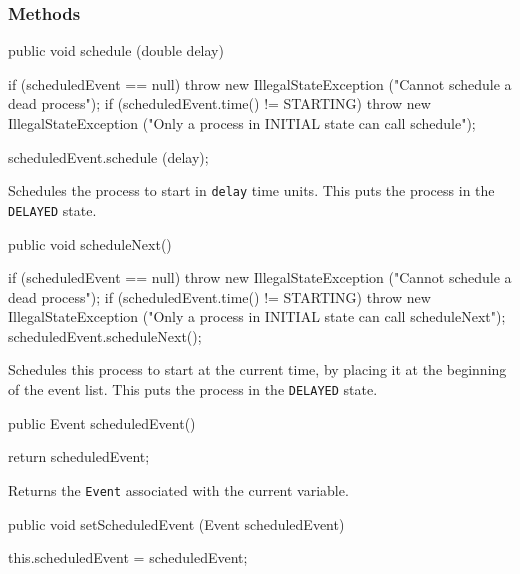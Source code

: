 \subsubsection* {Methods}
\begin{code}

   public void schedule (double delay) \begin{hide} {
      if (scheduledEvent == null)
         throw new IllegalStateException ("Cannot schedule a dead process");
      if (scheduledEvent.time() != STARTING)
         throw new IllegalStateException ("Only a process in INITIAL state can call schedule");

      scheduledEvent.schedule (delay);
   } \end{hide}
\end{code}
\begin{tabb}
   Schedules the process to start in \texttt{delay} time units.
   This puts the process in the \texttt{DELAYED} state.
  \end{tabb}
\begin{htmlonly}
\end{htmlonly}
\begin{code}

   public void scheduleNext() \begin{hide} {
      if (scheduledEvent == null)
         throw new IllegalStateException ("Cannot schedule a dead process");
      if (scheduledEvent.time() != STARTING)
         throw new IllegalStateException
            ("Only a process in INITIAL state can call scheduleNext");
      scheduledEvent.scheduleNext();
   } \end{hide}
\end{code}
\begin{tabb}  Schedules this process to start at the current time, by placing
   it at the beginning of the event list.
   This puts the process in the \texttt{DELAYED} state.
  \end{tabb}
\begin{code}

   public Event scheduledEvent() \begin{hide} {
      return scheduledEvent;
   } \end{hide}
\end{code}
\begin{tabb}
   Returns the \texttt{Event} associated with the current variable.
  \end{tabb}
\begin{code}

   public void setScheduledEvent (Event scheduledEvent) \begin{hide} {
      this.scheduledEvent = scheduledEvent;
   } \end{hide}
\end{code}

